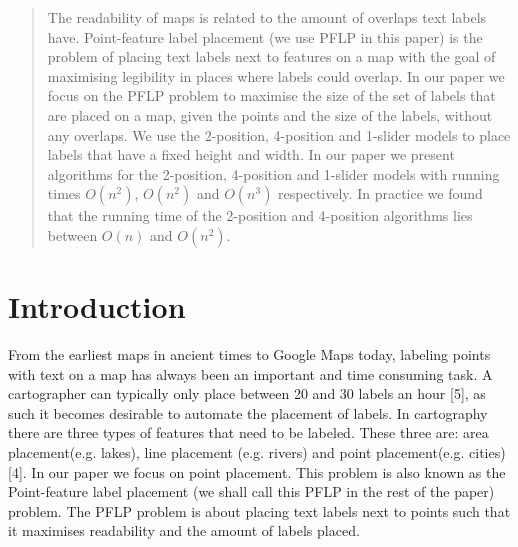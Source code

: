 \documentclass[crop=false,a4paper,oneside,11pt]{standalone}
\begin{document}
\begin{abstract}
The readability of maps is related to the amount of overlaps text labels have. Point-feature label placement (we use PFLP in this paper) is the problem of placing text labels next to features on a map with the goal of maximising legibility in places where labels could overlap. In our paper we focus on the PFLP problem to maximise the size of the set of labels that are placed on a map, given the points and the size of the labels, without any overlaps. We use the 2-position, 4-position and 1-slider models to place labels that have a fixed height and width. In our paper we present algorithms for the 2-position, 4-position and 1-slider models with running times $O(n^2)$, $O(n^2)$ and $O(n^3)$ respectively. In practice we found that the running time of the 2-position and 4-position algorithms lies between $O(n)$ and $O(n^2)$.
\end{abstract}

\section{Introduction}
From the earliest maps in ancient times to Google Maps today, labeling points with text on a map has always been an important and time consuming task. A cartographer can typically only place between 20 and 30 labels an hour [5], as such it becomes desirable to automate the placement of labels. In cartography there are three types of features that need to be labeled. These three are: area placement(e.g. lakes), line placement (e.g. rivers) and point placement(e.g. cities) [4]. In our paper we focus on point placement. This problem is also known as the Point-feature label placement (we shall call this PFLP in the rest of the paper) problem. The PFLP problem is about placing text labels next to points such that it maximises readability and the amount of labels placed.
\end{document}
